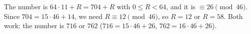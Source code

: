 The number is $64\cdot11+R=704+R$ with $0\le R<64$, and it is $\equiv26\pmod{46}$. Since $704=15\cdot46+14$, we need $R\equiv12\pmod{46}$, so $R=12$ or $R=58$. Both work: the number is $\boxed{716\text{ or }762}$ ($716=15\cdot46+26$, $762=16\cdot46+26$).

